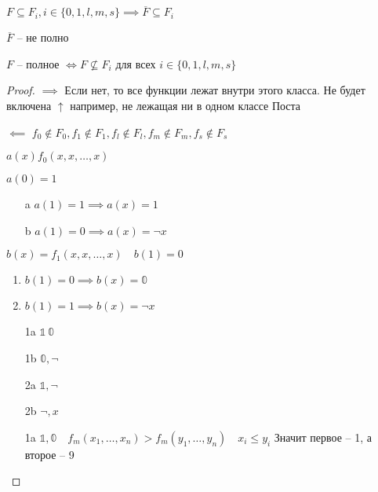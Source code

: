 \documentclass{book}
\theoremstyle{definition}
\begin{document}
    \begin{lemma}
        $F\subseteq F_i, i\in\{0,1,l,m,s\} \implies \overline{F}\subseteq F_i$
    \end{lemma}
    \begin{corollary}
        $\overline{F}$ -- не полно
    \end{corollary}
    \begin{theorem}
         $F$ -- полное $\iff F \not\subseteq F_i$ для всех $i\in \{0,1,l,m,s\}$
    \end{theorem}
    \begin{proof}
        $\implies $ Если нет, то все функции лежат внутри этого класса. Не будет включена $\uparrow$ например, не лежащая ни в одном классе Поста

        $\impliedby $ $f_0\not\in F_0, f_1 \not\in F_1, f_l \not\in F_l, f_m \not\in F_m, f_s \not\in F_s$

        $a(x) f_0\left(x, x, \ldots, x  \right) $

        $a\left(  0 \right) = 1$

        \begin{itemize}
            \item[a] $a(1) = 1 \implies a(x) = 1$
            \item[b] $a(1) = 0 \implies a(x) = \neg x$
        \end{itemize}
        $b(x) = f_1(x, x, \ldots, x)\quad b(1) = 0$
        \begin{enumerate}
            \item $b(1) = 0 \implies b(x) = \mathbb{0}$
            \item $b(1) = 1 \implies  b(x) = \neg x$
        \end{enumerate}

        \begin{itemize}
            \item [1a] $\mathbb{1~0}$
            \item [1b] $\mathbb{0}, \neg$
            \item [2a]  $\mathbb{1}, \neg$ 
            \item [2b] $\neg, x$
        \end{itemize}

        \begin{itemize}
            \item [1a] $\mathbb{1,0}\quad f_m(x_1, \ldots, x_{n} ) >f_m(y_1, \ldots, y_{n} )\quad x_i\leqslant y_i$ Значит первое -- 1, а второе -- 9


\end{itemize}
\end{proof}
\end{document}
